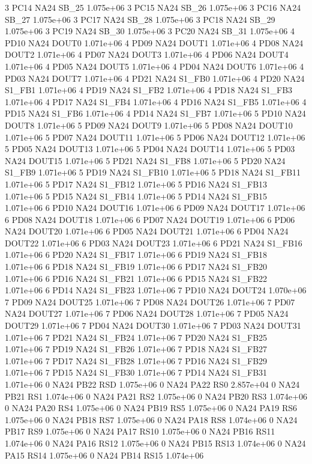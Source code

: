3 PC14 NA24 SB_25 1.075e+06 
3 PC15 NA24 SB_26 1.075e+06 
3 PC16 NA24 SB_27 1.075e+06 
3 PC17 NA24 SB_28 1.075e+06 
3 PC18 NA24 SB_29 1.075e+06 
3 PC19 NA24 SB_30 1.075e+06 
3 PC20 NA24 SB_31 1.075e+06 
4 PD10 NA24 DOUT0 1.071e+06 
4 PD09 NA24 DOUT1 1.071e+06 
4 PD08 NA24 DOUT2 1.071e+06 
4 PD07 NA24 DOUT3 1.071e+06 
4 PD06 NA24 DOUT4 1.071e+06 
4 PD05 NA24 DOUT5 1.071e+06 
4 PD04 NA24 DOUT6 1.071e+06 
4 PD03 NA24 DOUT7 1.071e+06 
4 PD21 NA24 S1_FB0 1.071e+06 
4 PD20 NA24 S1_FB1 1.071e+06 
4 PD19 NA24 S1_FB2 1.071e+06 
4 PD18 NA24 S1_FB3 1.071e+06 
4 PD17 NA24 S1_FB4 1.071e+06 
4 PD16 NA24 S1_FB5 1.071e+06 
4 PD15 NA24 S1_FB6 1.071e+06 
4 PD14 NA24 S1_FB7 1.071e+06 
5 PD10 NA24 DOUT8 1.071e+06 
5 PD09 NA24 DOUT9 1.071e+06 
5 PD08 NA24 DOUT10 1.071e+06 
5 PD07 NA24 DOUT11 1.071e+06 
5 PD06 NA24 DOUT12 1.071e+06 
5 PD05 NA24 DOUT13 1.071e+06 
5 PD04 NA24 DOUT14 1.071e+06 
5 PD03 NA24 DOUT15 1.071e+06 
5 PD21 NA24 S1_FB8 1.071e+06 
5 PD20 NA24 S1_FB9 1.071e+06 
5 PD19 NA24 S1_FB10 1.071e+06 
5 PD18 NA24 S1_FB11 1.071e+06 
5 PD17 NA24 S1_FB12 1.071e+06 
5 PD16 NA24 S1_FB13 1.071e+06 
5 PD15 NA24 S1_FB14 1.071e+06 
5 PD14 NA24 S1_FB15 1.071e+06 
6 PD10 NA24 DOUT16 1.071e+06 
6 PD09 NA24 DOUT17 1.071e+06 
6 PD08 NA24 DOUT18 1.071e+06 
6 PD07 NA24 DOUT19 1.071e+06 
6 PD06 NA24 DOUT20 1.071e+06 
6 PD05 NA24 DOUT21 1.071e+06 
6 PD04 NA24 DOUT22 1.071e+06 
6 PD03 NA24 DOUT23 1.071e+06 
6 PD21 NA24 S1_FB16 1.071e+06 
6 PD20 NA24 S1_FB17 1.071e+06 
6 PD19 NA24 S1_FB18 1.071e+06 
6 PD18 NA24 S1_FB19 1.071e+06 
6 PD17 NA24 S1_FB20 1.071e+06 
6 PD16 NA24 S1_FB21 1.071e+06 
6 PD15 NA24 S1_FB22 1.071e+06 
6 PD14 NA24 S1_FB23 1.071e+06 
7 PD10 NA24 DOUT24 1.070e+06 
7 PD09 NA24 DOUT25 1.071e+06 
7 PD08 NA24 DOUT26 1.071e+06 
7 PD07 NA24 DOUT27 1.071e+06 
7 PD06 NA24 DOUT28 1.071e+06 
7 PD05 NA24 DOUT29 1.071e+06 
7 PD04 NA24 DOUT30 1.071e+06 
7 PD03 NA24 DOUT31 1.071e+06 
7 PD21 NA24 S1_FB24 1.071e+06 
7 PD20 NA24 S1_FB25 1.071e+06 
7 PD19 NA24 S1_FB26 1.071e+06 
7 PD18 NA24 S1_FB27 1.071e+06 
7 PD17 NA24 S1_FB28 1.071e+06 
7 PD16 NA24 S1_FB29 1.071e+06 
7 PD15 NA24 S1_FB30 1.071e+06 
7 PD14 NA24 S1_FB31 1.071e+06 
0 NA24 PB22 RSD 1.075e+06 
0 NA24 PA22 RS0 2.857e+04 
0 NA24 PB21 RS1 1.074e+06 
0 NA24 PA21 RS2 1.075e+06 
0 NA24 PB20 RS3 1.074e+06 
0 NA24 PA20 RS4 1.075e+06 
0 NA24 PB19 RS5 1.075e+06 
0 NA24 PA19 RS6 1.075e+06 
0 NA24 PB18 RS7 1.075e+06 
0 NA24 PA18 RS8 1.074e+06 
0 NA24 PB17 RS9 1.075e+06 
0 NA24 PA17 RS10 1.075e+06 
0 NA24 PB16 RS11 1.074e+06 
0 NA24 PA16 RS12 1.075e+06 
0 NA24 PB15 RS13 1.074e+06 
0 NA24 PA15 RS14 1.075e+06 
0 NA24 PB14 RS15 1.074e+06 
